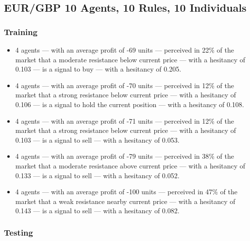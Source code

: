 \subsection{EUR/GBP 10 Agents, 10 Rules, 10 Individuals}
\label{results:interpretation-eur-gbp-10agents-10rules-10individuals}


\subsubsection{Training}

{\small
  \begin{itemize}
  \item 4 agents — with an average profit of -69 units — perceived in 22\% of
    the market that a moderate resistance below current price — with a hesitancy
    of 0.103 — is a signal to buy — with a hesitancy of 0.205.
  \item 4 agents — with an average profit of -70 units — perceived in 12\% of
    the market that a strong resistance below current price — with a hesitancy
    of 0.106 — is a signal to hold the current position — with a hesitancy of
    0.108.
  \item 4 agents — with an average profit of -71 units — perceived in 12\% of
    the market that a strong resistance below current price — with a hesitancy
    of 0.103 — is a signal to sell — with a hesitancy of 0.053.
  \item 4 agents — with an average profit of -79 units — perceived in 38\% of
    the market that a moderate resistance above current price — with a hesitancy
    of 0.133 — is a signal to sell — with a hesitancy of 0.052.
  \item 4 agents — with an average profit of -100 units — perceived in 47\% of
    the market that a weak resistance nearby current price — with a hesitancy of
    0.143 — is a signal to sell — with a hesitancy of 0.082.
  \end{itemize}
}

\subsubsection{Testing}

